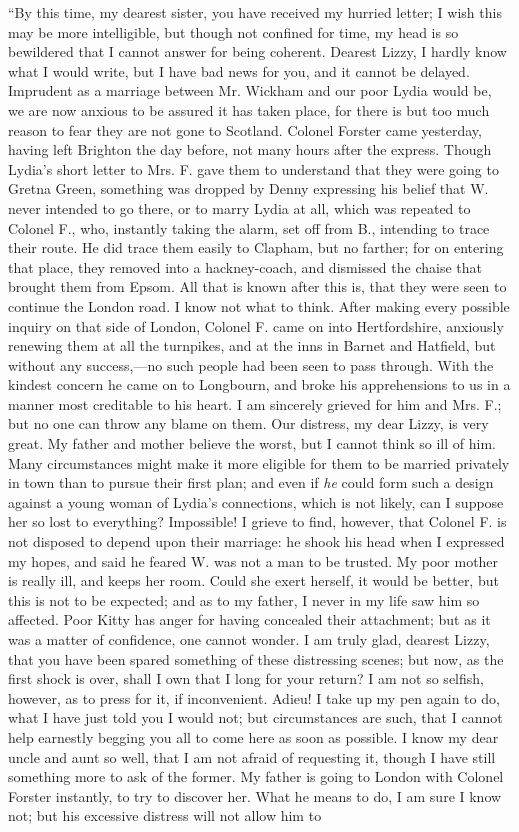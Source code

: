 ``By this time, my dearest sister, you have received my hurried letter; I wish this may be more intelligible, but though not confined for time, my head is so bewildered that I cannot answer for being coherent. Dearest Lizzy, I hardly know what I would write, but I have bad news for you, and it cannot be delayed. Imprudent as a marriage between Mr. Wickham and our poor Lydia would be, we are now anxious to be assured it has taken place, for there is but too much reason to fear they are not gone to Scotland. Colonel Forster came yesterday, having left Brighton the day before, not many hours after the express. Though Lydia's short letter to Mrs. F. gave them to understand that they were going to Gretna Green, something was dropped by Denny expressing his belief that W. never intended to go there, or to marry Lydia at all, which was repeated to Colonel F., who, instantly taking the alarm, set off from B., intending to trace their route. He did trace them easily to Clapham, but no farther; for on entering that place, they removed into a hackney-coach, and dismissed the chaise that brought them from Epsom. All that is known after this is, that they were seen to continue the London road. I know not what to think. After making every possible inquiry on that side of London, Colonel F. came on into Hertfordshire, anxiously renewing them at all the turnpikes, and at the inns in Barnet and Hatfield, but without any success,---no such people had been seen to pass through. With the kindest concern he came on to Longbourn, and broke his apprehensions to us in a manner most creditable to his heart. I am sincerely grieved for him and Mrs. F.; but no one can throw any blame on them. Our distress, my dear Lizzy, is very great. My father and mother believe the worst, but I cannot think so ill of him. Many circumstances might make it more eligible for them to be married privately in town than to pursue their first plan; and even if \textit{he} could form such a design against a young woman of Lydia's connections, which is not likely, can I suppose her so lost to everything? Impossible! I grieve to find, however, that Colonel F. is not disposed to depend upon their marriage: he shook his head when I expressed my hopes, and said he feared W. was not a man to be trusted. My poor mother is really ill, and keeps her room. Could she exert herself, it would be better, but this is not to be expected; and as to my father, I never in my life saw him so affected. Poor Kitty has anger for having concealed their attachment; but as it was a matter of confidence, one cannot wonder. I am truly glad, dearest Lizzy, that you have been spared something of these distressing scenes; but now, as the first shock is over, shall I own that I long for your return? I am not so selfish, however, as to press for it, if inconvenient. Adieu! I take up my pen again to do, what I have just told you I would not; but circumstances are such, that I cannot help earnestly begging you all to come here as soon as possible. I know my dear uncle and aunt so well, that I am not afraid of requesting it, though I have still something more to ask of the former. My father is going to London with Colonel Forster instantly, to try to discover her. What he means to do, I am sure I know not; but his excessive distress will not allow him to 